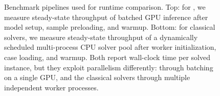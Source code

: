 \begin{figure}[t]
{
    }
    \caption{Benchmark pipelines used for runtime comparison. Top: for \genco, we measure steady-state throughput of batched GPU inference after model setup, sample preloading, and warmup. Bottom: for classical solvers, we measure steady-state throughput of a dynamically scheduled multi-process CPU solver pool after worker initialization, case loading, and warmup. Both report wall-clock time per solved instance, but they exploit parallelism differently: \genco through batching on a single GPU, and the classical solvers through multiple independent worker processes.}
    \label{fig:benchmark_pipeline_diagram}
    \end{figure}
    